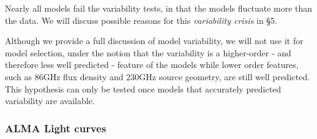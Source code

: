 Nearly all models fail the variability tests, in that the models fluctuate more than the data.  We will discuss possible reasons for this {\em variability crisis} in \S 5. 

Although we provide a full discussion of model variability, we will not use it for model selection, under the notion that the variability is a higher-order - and therefore less well predicted -  feature of the models while lower order features, such as 86GHz flux density and 230GHz source geometry, are still well predicted.  This hypothesis can only be tested once models that accurately predicted variability are available.   



\subsubsection{ALMA Light curves}

